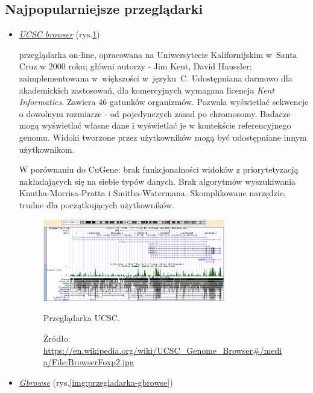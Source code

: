 \subsection*{Najpopularniejsze przeglądarki}
\begin{itemize}
	\item \href{https://genome.ucsc.edu}{\emph{UCSC browser}} (rys.\ref{img:przegladarka-UCSC}) \label{przegladarka-UCSC}
	
	przeglądarka on-line, opracowana na Uniwersytecie Kalifornijskim w~Santa Cruz w 2000 roku; główni autorzy - Jim Kent, David Haussler; zaimplementowana w~większości w~języku~C. Udostępniana darmowo dla akademickich zastosowań, dla komercyjnych wymagana licencja \emph{Kent Informatics}. Zawiera 46 gatunków organizmów. Pozwala wyświetlać sekwencje o dowolnym rozmiarze - od pojedynczych zasad po chromosomy. Badacze mogą wyświetlać własne dane i wyświetlać je w kontekście referencyjnego genomu. Widoki tworzone przez użytkowników mogą być udostępniane innym użytkownikom.
	
	W porównaniu do CuGene:
	brak funkcjonalności widoków z priorytetyzacją nakładających się na siebie typów danych. Brak algorytmów wyszukiwania Knutha-Morrisa-Pratta i Smitha-Watermana. Skomplikowane narzędzie, trudne dla początkujących użytkowników.
	\begin{figure}[h]
		\centering
		\includegraphics[width=0.75\textwidth]{img/browser-UCSC.jpg}
		\caption{Przeglądarka UCSC.}
		\vspace{-0.5cm}
		\caption*{\scriptsize Źródło: \url{https://en.wikipedia.org/wiki/UCSC\_Genome\_Browser\#/media/File:BrowserFoxp2.jpg}}
		\label{img:przegladarka-UCSC}
	\end{figure}
	
	\item \href{http://gbrowse.org}{\emph{Gbrowse}} (rys.\ref{img:przegladarka-gbrowse})
	\label{przegladarka-Gbrowse}
	

\end{itemize}
